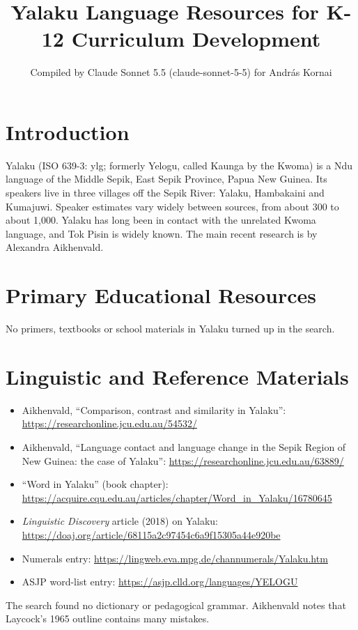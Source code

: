 \documentclass[12pt]{article}
\title{Yalaku Language Resources for K-12 Curriculum Development}
\author{Compiled by Claude Sonnet 5.5 (claude-sonnet-5-5) for Andr\'as Kornai}
\date{}
\begin{document}
\maketitle

\section{Introduction}
Yalaku (ISO 639-3: ylg; formerly Yelogu, called Kaunga by the Kwoma) is a Ndu language of the Middle Sepik, East Sepik Province, Papua New Guinea. Its speakers live in three villages off the Sepik River: Yalaku, Hambakaini and Kumajuwi. Speaker estimates vary widely between sources, from about 300 to about 1,000. Yalaku has long been in contact with the unrelated Kwoma language, and Tok Pisin is widely known. The main recent research is by Alexandra Aikhenvald.

\section{Primary Educational Resources}
No primers, textbooks or school materials in Yalaku turned up in the search.

\section{Linguistic and Reference Materials}
\begin{itemize}
\item Aikhenvald, ``Comparison, contrast and similarity in Yalaku'': \url{https://researchonline.jcu.edu.au/54532/}
\item Aikhenvald, ``Language contact and language change in the Sepik Region of New Guinea: the case of Yalaku'': \url{https://researchonline.jcu.edu.au/63889/}
\item ``Word in Yalaku'' (book chapter): \url{https://acquire.cqu.edu.au/articles/chapter/Word_in_Yalaku/16780645}
\item \emph{Linguistic Discovery} article (2018) on Yalaku: \url{https://doaj.org/article/68115a2c97454c6a9f15305a44e920be}
\item Numerals entry: \url{https://lingweb.eva.mpg.de/channumerals/Yalaku.htm}
\item ASJP word-list entry: \url{https://asjp.clld.org/languages/YELOGU}
\end{itemize}
The search found no dictionary or pedagogical grammar. Aikhenvald notes that Laycock's 1965 outline contains many mistakes.
\end{document}
